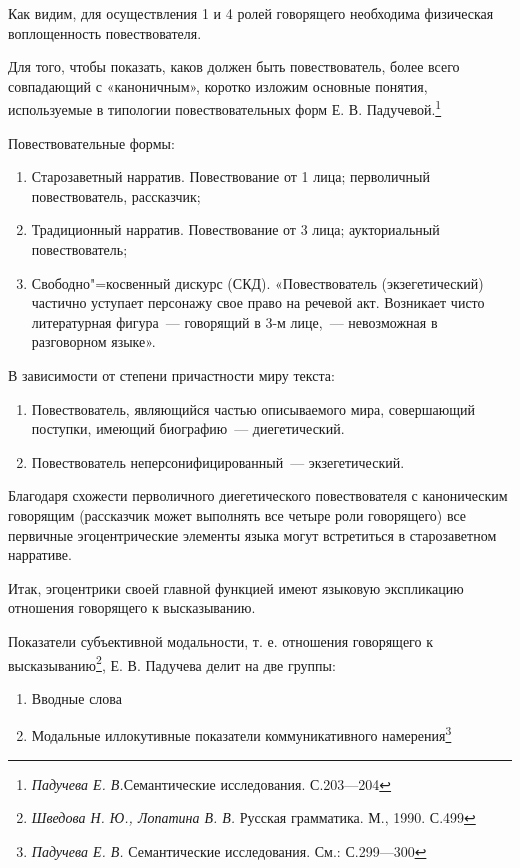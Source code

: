 \documentclass{kursa4}
\begin{document}
      \bigskip

      Как видим, для осуществления 1 и 4 ролей говорящего необходима физическая воплощенность повествователя. 

      Для того, чтобы показать, каков должен быть повествователь, более всего совпадающий с «каноничным», коротко изложим основные понятия, используемые в типологии повествовательных форм Е. В. Падучевой.\footnote{\textit{Падучева Е. В.}Семантические исследования. С.203—204} \newline

      Повествовательные формы:
      \begin{enumerate}
        \item Старозаветный нарратив. Повествование от 1 лица; перволичный повествователь, рассказчик; 
        \item Традиционный нарратив. Повествование от 3 лица; аукториальный повествователь; \item Свободно"=косвенный дискурс (СКД). «Повествователь (экзегетический) частично уступает персонажу свое право на речевой акт. Возникает чисто литературная фигура~--- говорящий в 3-м лице,~--- невозможная в разговорном языке». \end{enumerate}

      В зависимости от степени причастности миру текста: \begin{enumerate}
        \item Повествователь, являющийся частью описываемого мира, совершающий поступки, имеющий биографию~--- диегетический. 
        \item Повествователь неперсонифицированный~--- экзегетический. 
       \end{enumerate} 

      Благодаря схожести перволичного диегетического повествователя с каноническим говорящим (рассказчик может выполнять все четыре роли говорящего) все первичные эгоцентрические элементы языка могут встретиться в старозаветном нарративе. 

      Итак, эгоцентрики своей главной функцией имеют языковую экспликацию отношения говорящего к высказыванию. 

      Показатели субъективной модальности, т. е. отношения говорящего к высказыванию\footnote{\textit{ Шведова Н. Ю., Лопатина В. В.} Русская грамматика. М., 1990. С.499}, Е. В. Падучева делит на две группы: 

      \begin{enumerate}
        \item Вводные слова \item Модальные иллокутивные показатели коммуникативного намерения\footnote{\textit{Падучева Е. В.} Семантические исследования. См.: С.299—300}        
      \end{enumerate}
\end{document}
